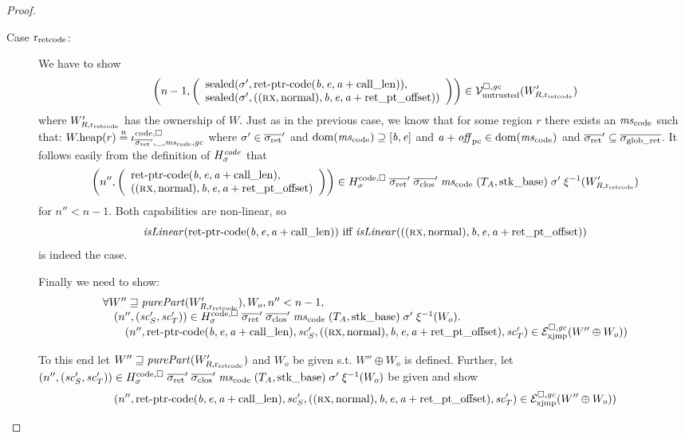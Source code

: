 \begin{proof}
\begin{description}
  \item[Case $\rretc$:]
    We have to show
    \[
      \npair[n-1]{\left(\array{l}\sealed{\sigma',\retptrc(\baddr,\eaddr,\aaddr +
            \calllen)},\\\sealed{\sigma',((\rx,\normal),\baddr,\eaddr,\aaddr + \retoffset)}\endarray\right)} \in \lrv(W_{R,\rretc}')
    \]
    where $W_{R,\rretc}'$ has the ownership of $W$.
    Just as in the previous case, we know that for some region $r$ there exists an $\mscode$ such that: $\pwheap(r) \nequal \codereg{\sigrets',\_,\mscode,\gc}$ where $\sigma' \in \sigrets'$ and $\dom(\mscode) \supseteq [\baddr,\eaddr]$ and $\aaddr + \offpc \in \dom(\mscode)$ and $\sigrets' \subseteq \gsigrets$.
    It follows easily from the definition of $H_\sigma^\var{code}$ that
    \begin{equation}
      \label{eq:code-caps-in-h-sigma}
      \npair[n'']{\left(\array{l}\retptrc(\baddr,\eaddr,\aaddr + \calllen),\\((\rx,\normal),\baddr,\eaddr,\aaddr + \retoffset)\endarray\right)} \in H^\mathrm{code,\square}_\sigma \; \sigrets' \; \sigcloss' \; \mscode \; (\ta,\stkb) \; \sigma' \; \xi^{-1}(W_{R,\rretc}')
    \end{equation}
    for $n'' < n-1$.
    Both capabilities are non-linear, so
    \[
      \isLinear{\retptrc(\baddr,\eaddr,\aaddr + \calllen)}\text{ iff } \isLinear{((\rx,\normal),\baddr,\eaddr,\aaddr + \retoffset)}
    \]
    is indeed the case.

    Finally we need to show:
    \[
      \begin{array}{l}
        \forall W'' \future \purePart{W_{R,\rretc}'}, W_o, n'' < n-1,\\
        \quad  \npair[n'']{(\vsc_S',\vsc'_T)} \in H^\mathrm{code,\square}_\sigma \; \sigrets' \; \sigcloss' \; \mscode \; (\ta,\stkb) \; \sigma' \; \xi^{-1}(W_o) \ldotp \\
        \qquad \npair[n'']{\retptrc(\baddr,\eaddr,\aaddr + \calllen),\vsc_S',((\rx,\normal),\baddr,\eaddr,\aaddr + \retoffset),\vsc_T'} \in \lrexj(W''\oplus W_o))
      \end{array}
    \]

    To this end let $W'' \future \purePart{W_{R,\rretc}'}$ and $W_o$ be given s.t. $W'' \oplus W_o$ is defined.
    Further, let $\npair[n'']{(\vsc_S',\vsc'_T)} \in H^\mathrm{code,\square}_\sigma \; \sigrets' \; \sigcloss' \; \mscode \; (\ta,\stkb) \; \sigma' \; \xi^{-1}(W_o)$ be given and show
    \[
      \npair[n'']{\retptrc(\baddr,\eaddr,\aaddr + \calllen),\vsc_S',((\rx,\normal),\baddr,\eaddr,\aaddr + \retoffset),\vsc_T'} \in \lrexj(W''\oplus W_o))
    \]


\end{description}
\end{proof}
